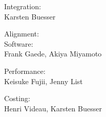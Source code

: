 \vspace*{2mm}
\noindent Integration:\\
Karsten Buesser

\vspace*{2mm}
\noindent Alignment:\\

\vspace*{2mm}
\noindent Software:\\
Frank Gaede, Akiya Miyamoto

\vspace*{2mm}
\noindent Performance:\\
Keisuke Fujii, Jenny List

\vspace*{2mm}
\noindent Costing:\\
Henri Videau, Karsten Buesser

%




%
%
%
